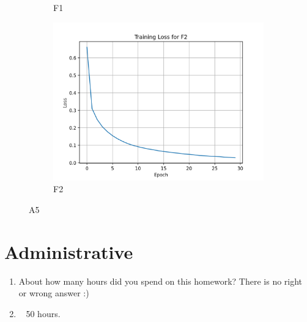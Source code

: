 \documentclass{article}
\begin{document}
\begin{aprob}
\begin{figure}[!h]
\begin{subfigure}{.45\textwidth}
            \caption{F1}
            \label{fig:f1}
        \end{subfigure}
        \begin{subfigure}{.45\textwidth}
            \centering
            \includegraphics[width=.9\linewidth]{f2.png}
            \caption{F2}
            \label{fig:f2}
        \end{subfigure}
        \caption{A5}
    \end{figure}
\end{aprob}

\section*{Administrative}
\begin{aprob}
\begin{enumerate}
    \item {} About how many hours did you spend on this homework? There is no right or wrong answer :)
    \item ~ 50 hours.
\end{enumerate}
    
\end{aprob}
\end{document}
